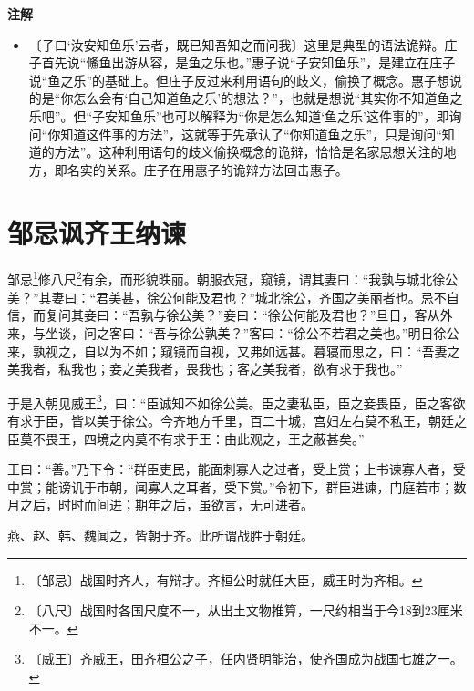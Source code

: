 \documentclass[12pt,UTF-8,openany,a4]{ctexbook}
\begin{document}
\newpage

\begin{Large}
    \noindent\textbf{注解}
\end{Large}


\vspace{-1em}

\begin{itemize}
    \setlength\itemsep{-0.2em}
    \item〔子曰‘汝安知鱼乐’云者，既已知吾知之而问我〕{\yiwen 这里是典型的语法诡辩。庄子首先说“鯈鱼出游从容，是鱼之乐也。”惠子说“子安知鱼乐”，是建立在庄子说“鱼之乐”的基础上。但庄子反过来利用语句的歧义，偷换了概念。惠子想说的是“你怎么会有‘自己知道鱼之乐’的想法？”，也就是想说“其实你不知道鱼之乐吧”。但“子安知鱼乐”也可以解释为“你是怎么知道‘鱼之乐’这件事的”，即询问“你知道这件事的方法”，这就等于先承认了“你知道鱼之乐”，只是询问“知道的方法”。这种利用语句的歧义偷换概念的诡辩，恰恰是名家思想关注的地方，即名实的关系。庄子在用惠子的诡辩方法回击惠子。}
\end{itemize}

\chapter{邹忌讽齐王纳谏}

\begin{large}
    
    邹忌\footnote{〔邹忌〕\yiwen 战国时齐人，有辩才。齐桓公时就任大臣，威王时为齐相。}修八尺\footnote{〔八尺〕\yiwen 战国时各国尺度不一，从出土文物推算，一尺约相当于今18到23厘米不一。}有余，而形貌昳丽。朝服衣冠，窥镜，谓其妻曰：“我孰与城北徐公美？”其妻曰：“君美甚，徐公何能及君也？”城北徐公，齐国之美丽者也。忌不自信，而复问其妾曰：“吾孰与徐公美？”妾曰：“徐公何能及君也？”旦日，客从外来，与坐谈，问之客曰：“吾与徐公孰美？”客曰：“徐公不若君之美也。”明日徐公来，孰视之，自以为不如；窥镜而自视，又弗如远甚。暮寝而思之，曰：“吾妻之美我者，私我也；妾之美我者，畏我也；客之美我者，欲有求于我也。”
    
    于是入朝见威王\footnote{〔威王〕\yiwen 齐威王，田齐桓公之子，任内贤明能治，使齐国成为战国七雄之一。}，曰：“臣诚知不如徐公美。臣之妻私臣，臣之妾畏臣，臣之客欲有求于臣，皆以美于徐公。今齐地方千里，百二十城，宫妇左右莫不私王，朝廷之臣莫不畏王，四境之内莫不有求于王：由此观之，王之蔽甚矣。”
    
    王曰：“善。”乃下令：“群臣吏民，能面刺寡人之过者，受上赏；上书谏寡人者，受中赏；能谤讥于市朝，闻寡人之耳者，受下赏。”令初下，群臣进谏，门庭若市；数月之后，时时而间进；期年之后，虽欲言，无可进者。
    
    燕、赵、韩、魏闻之，皆朝于齐。此所谓战胜于朝廷。
\end{large}
\end{document}
